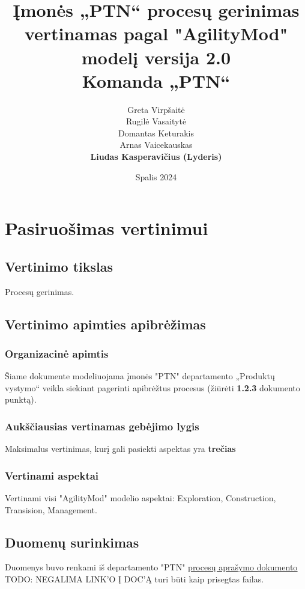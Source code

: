 \documentclass{article}
\title{
    Įmonės „PTN“ procesų gerinimas\\
    \large vertinamas pagal  "AgilityMod" modelį 
    \large versija 2.0 \\
    \large Komanda „PTN“}
\author{
    Greta Virpšaitė \\
    Rugilė Vasaitytė \\
    Domantas Keturakis \\
    Arnas Vaicekauskas \\
    \textbf{Liudas Kasperavičius (Lyderis)} 
}
\date{Spalis 2024}
\begin{document}


\maketitle

\newpage
\tableofcontents

\newpage

\section{Pasiruošimas vertinimui}

\subsection{Vertinimo tikslas}

Procesų gerinimas.

\subsection{Vertinimo apimties apibrėžimas}

\subsubsection{Organizacinė apimtis}
Šiame dokumente modeliuojama įmonės "PTN" departamento „Produktų vystymo“ veikla siekiant pagerinti apibrėžtus procesus (žiūrėti \textbf{1.2.3}  dokumento punktą).

\subsubsection{Aukščiausias vertinamas gebėjimo lygis}

Maksimalus vertinimas, kurį gali pasiekti aspektas yra \textbf{trečias}

\subsubsection{Vertinami aspektai}

Vertinami visi "AgilityMod" modelio aspektai: Exploration,  Construction, Transision, Management.

\subsection{Duomenų surinkimas}

Duomenys buvo renkami iš departamento "PTN" \underline{\href{https://github.com/ArnasVaic/software-process/blob/main/PTN.pdf}{procesų aprašymo dokumento}} TODO: NEGALIMA LINK'O Į DOC'Ą turi būti kaip prisegtas failas.
\end{document}
